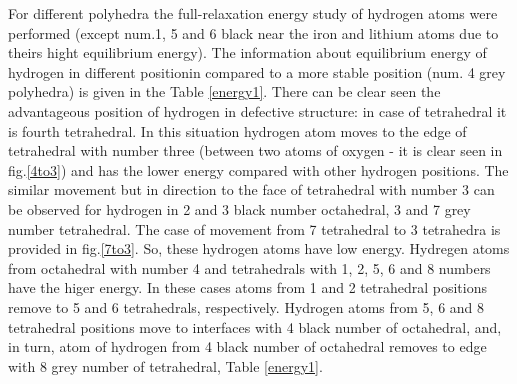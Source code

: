 \documentclass[11pt]{article}
\begin{document}
 For different polyhedra the full-relaxation energy study of hydrogen atoms were performed (except num.1, 5 and 6 black near the iron and lithium atoms due to theirs hight equilibrium energy). The information about equilibrium energy of hydrogen in different positionin compared to a more stable position (num. 4 grey polyhedra) is given in the Table \ref{energy1}. There can be clear seen the advantageous position of hydrogen in defective structure: in case of tetrahedral it is fourth tetrahedral. In this situation hydrogen atom moves to the edge of tetrahedral with number three (between two atoms of oxygen - it is clear seen in fig.\ref{4to3}) and has the lower energy compared with other hydrogen positions. The similar movement but in direction to the face of tetrahedral with number 3 can be observed for hydrogen in 2 and 3 black number octahedral, 3 and 7 grey number tetrahedral. The case of movement from 7 tetrahedral to 3 tetrahedra is provided in fig.\ref{7to3}.  So, these hydrogen atoms have low energy. Hydregen atoms from octahedral with number 4 and tetrahedrals with 1, 2, 5, 6 and 8 numbers have the higer energy. In these cases atoms from 1 and 2 tetrahedral positions remove to 5 and 6 tetrahedrals, respectively. Hydrogen atoms from 5, 6 and 8 tetrahedral positions move to interfaces with 4 black number of octahedral, and, in turn, atom of hydrogen from 4 black number of octahedral removes to edge with 8 grey number of tetrahedral, Table \ref{energy1}.
\end{document}
